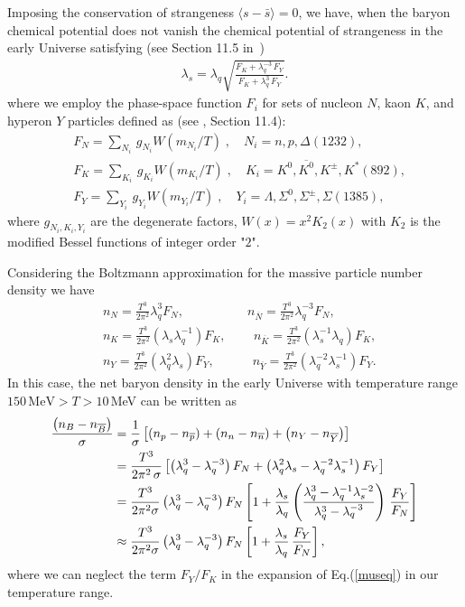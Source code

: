 Imposing the conservation of strangeness  
$\langle s-\bar s \rangle=0$, we have, when the baryon chemical potential does not vanish the chemical potential of strangeness in the early Universe satisfying (see Section 11.5 in \,\cite{Letessier:2002ony})
\begin{align}\label{museq}
\lambda_s=\lambda_q\sqrt{\frac{F_K+\lambda^{-3}_q\,F_Y}{F_K+\lambda^3_q\,F_Y}}.
\end{align}
where we employ the phase-space function $F_i$ for sets of nucleon $N$, kaon $K$, and hyperon $Y$ particles defined as (see \cite{Letessier:2002ony}, Section 11.4):
\begin{align}
&F_N=\sum_{N_i}\,g_{N_i}W(m_{N_i}/T)\;, \quad N_i=n, p, \Delta(1232),\\
&F_K=\sum_{K_i}\,g_{K_i}W(m_{K_i}/T)\;, \quad K_i=K^0, \overline{K^0}, K^\pm, K^\ast(892),\\
&F_Y=\sum_{Y_i}\,g_{Y_i}W(m_{Y_i}/T)\;, \quad Y_i=\Lambda, \Sigma^0,\Sigma^\pm, \Sigma(1385),
\end{align}
where $g_{N_i,K_i,Y_i}$ are the degenerate factors, $W(x)=x^2K_2(x)$ with $K_2$ is the modified Bessel functions of integer order "$2$".  

Considering the Boltzmann approximation for the massive particle number density we have
\begin{align}
\label{Density_N}
&n_N=\frac{T^3}{2\pi^2}\lambda_q^3F_N,\quad\qquad\qquad n_{\overline N}=\frac{T^3}{2\pi^2}\lambda^{-3}_qF_N,\\
\label{Density_K}
&n_K=\frac{T^3}{2\pi^2}\left(\lambda_s\lambda_q^{-1}\right)F_K,\,\qquad n_{\overline{K}}=\frac{T^3}{2\pi^2}\left(\lambda_s^{-1}\lambda_q\right)F_K,\\
\label{Density_Y}
&n_Y=\frac{T^3}{2\pi^2}\left(\lambda_q^2\lambda_s\right)F_Y,\quad\qquad n_{\overline Y}=\frac{T^3}{2\pi^2}\left(\lambda^{-2}_q\lambda_s^{-1}\right)F_Y.
\end{align}
In this case, the net baryon density in the early Universe with temperature range $150\,\mathrm{MeV}> T>10$\,MeV can be written as 
\begin{align}
\frac{\left(n_B-n_{\overline{B}}\right)}{\sigma}&=\frac{1}{\sigma}\left[\left(n_p-n_{\overline{p}}\right)+\left(n_n-n_{\overline{n}}\right)+\left(n_Y-n_{\overline{Y}}\right)\right]\notag\\
&=\frac{T^3}{2\pi^2\,\sigma}\left[\left(\lambda_q^3-\lambda^{-3}_q\right)F_N+\left(\lambda_q^2\lambda_s-\lambda^{-2}_q\lambda_s^{-1}\right)F_Y\right]\notag\\
&=\frac{T^3}{2\pi^2\sigma}\left(\lambda_q^3-\lambda_q^{-3}\right)F_N\left[1+\frac{\lambda_s}{\lambda_q}\left(\frac{\lambda_q^3-\lambda^{-1}_q\lambda_s^{-2}}{\lambda^3_q-\lambda^{-3}_q}\right)\,\frac{F_Y}{F_N}\right]\notag\\
&\approx\frac{T^3}{2\pi^2\sigma}\left(\lambda_q^3-\lambda_q^{-3}\right)F_N\left[1+\frac{\lambda_s}{\lambda_q}\,\frac{F_Y}{F_N}\right],
\end{align}
where we can neglect the term $F_Y/F_K$ in the expansion of Eq.(\ref{museq}) in our temperature range. 

